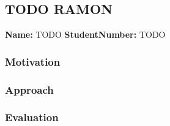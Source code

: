 \subsection{TODO RAMON}
\textbf{Name:} TODO \indent \textbf{StudentNumber:} TODO

\subsubsection*{Motivation}

\subsubsection*{Approach}

\subsubsection*{Evaluation }